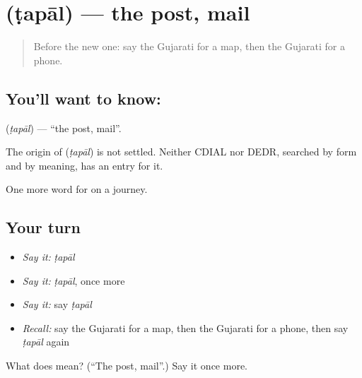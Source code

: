 \section[\texorpdfstring{\gu{ટપાલ} (ṭapāl)}{ટપાલ (ṭapāl)}]{ (ṭapāl) — the post, mail}

\label{lesson:GU-C86-post}



\begin{quote}
Before the new one: say the Gujarati for a map, then the Gujarati for a phone.
\end{quote}

\subsection*{You'll want to know: }
\textbf{} (\emph{ṭapāl}) — \textquotedblleft{}the post, mail\textquotedblright{}.

\begin{cousinweb}
The origin of \textbf{} (\emph{ṭapāl}) is not settled. Neither CDIAL nor DEDR, searched by form and by meaning, has an entry for it.
\end{cousinweb}

\begin{grammarlens}[title={What you've built}]
One more word for on a journey.
\end{grammarlens}

\subsection*{Your turn}
\begin{itemize}
\raggedright
  \item \emph{Say it:} \emph{ṭapāl}
  \item \emph{Say it:} \emph{ṭapāl}, once more
  \item \emph{Say it:} say \emph{ṭapāl}
  \item \emph{Recall:} say the Gujarati for a map, then the Gujarati for a phone, then say \emph{ṭapāl} again
\end{itemize}

\begin{tcolorbox}[breakable,colback=teal!4,colframe=teal!35!black,title={Before you move on}]
What does  mean? (\textquotedblleft{}The post, mail\textquotedblright{}.) Say it once more.
\end{tcolorbox}
